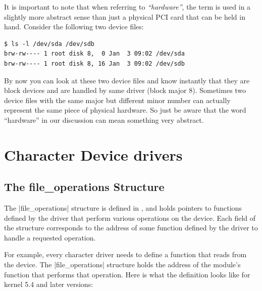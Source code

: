 \documentclass[10pt, oneside]{book}
\begin{document}
It is important to note that when referring to \emph{``hardware''},
the term is used in a slightly more abstract sense than just a physical PCI card that can be held in hand.
Consider the following two device files:

\begin{verbatim}
$ ls -l /dev/sda /dev/sdb
brw-rw---- 1 root disk 8,  0 Jan  3 09:02 /dev/sda
brw-rw---- 1 root disk 8, 16 Jan  3 09:02 /dev/sdb
\end{verbatim}

By now you can look at these two device files and know instantly that they are block devices and are handled by same driver (block major 8).
Sometimes two device files with the same major but different minor number can actually represent the same piece of physical hardware.
So just be aware that the word ``hardware'' in our discussion can mean something very abstract.

\section{Character Device drivers}
\label{sec:chardev}
\subsection{The file\_operations Structure}
\label{sec:file_operations}
The \cpp|file_operations| structure is defined in , and holds pointers to functions defined by the driver that perform various operations on the device.
Each field of the structure corresponds to the address of some function defined by the driver to handle a requested operation.

For example, every character driver needs to define a function that reads from the device.
The \cpp|file_operations| structure holds the address of the module's function that performs that operation.
Here is what the definition looks like for kernel 5.4 and later versions:
\end{document}
